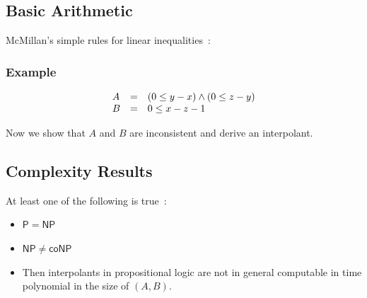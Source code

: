 \documentclass{article}
\begin{document}
\newpage
\subsection{Basic Arithmetic}

McMillan's simple rules for linear inequalities~\cite{m-tcs-2005}:

\begin{mathpar}


\end{mathpar}

\subsubsection{Example}

$$\begin{array}{l l l}
  A & = & (0 \leq y - x) \wedge (0 \leq z - y)
\\B & = & 0 \leq x - z - 1
\end{array}$$

Now we show that $A$ and $B$ are inconsistent and derive an interpolant.

\vspace{0.2cm}

\begin{mathpar}
\end{mathpar}


\subsection{Complexity Results}
At least one of the following is true~\cite{m-pal-1984}:
\begin{itemize}
\item $\mathsf{P} = \mathsf{NP}$
\item $\mathsf{NP} \neq \mathsf{coNP}$
\item Then interpolants in propositional logic are not in general computable
      in time polynomial in the size of $(A, B)$.
\end{itemize}
\end{document}
